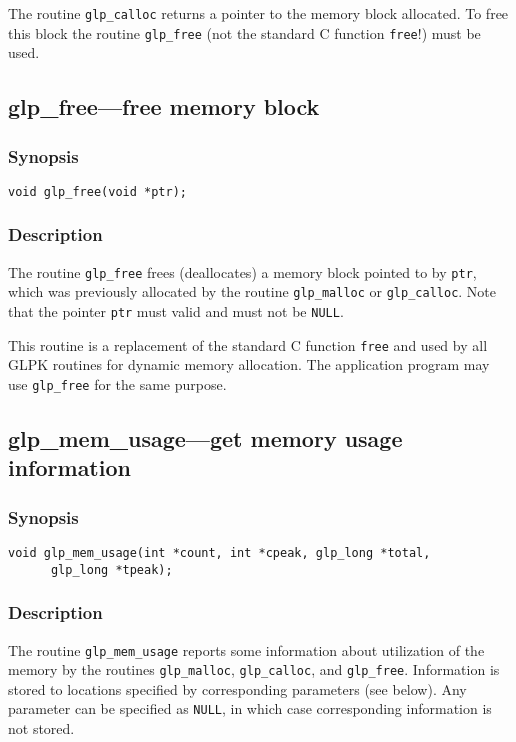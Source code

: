 The routine \verb|glp_calloc| returns a pointer to the memory block
allocated. To free this block the routine \verb|glp_free| (not the
standard C function \verb|free|!) must be used.

\subsection{glp\_free---free memory block}

\subsubsection*{Synopsis}

\begin{verbatim}
void glp_free(void *ptr);
\end{verbatim}

\subsubsection*{Description}

The routine \verb|glp_free| frees (deallocates) a memory block pointed
to by \verb|ptr|, which was previously allocated by the routine
\verb|glp_malloc| or \verb|glp_calloc|. Note that the pointer \verb|ptr|
must valid and must not be \verb|NULL|.

This routine is a replacement of the standard C function \verb|free|
and used by all GLPK routines for dynamic memory allocation. The
application program may use \verb|glp_free| for the same purpose.

\subsection{glp\_mem\_usage---get memory usage information}

\subsubsection*{Synopsis}

\begin{verbatim}
void glp_mem_usage(int *count, int *cpeak, glp_long *total,
      glp_long *tpeak);
\end{verbatim}

\subsubsection*{Description}

The routine \verb|glp_mem_usage| reports some information about
utilization of the memory by the routines \verb|glp_malloc|,
\verb|glp_calloc|, and \verb|glp_free|. Information is stored to
locations specified by corresponding parameters (see below). Any
parameter can be specified as \verb|NULL|, in which case corresponding
information is not stored.

